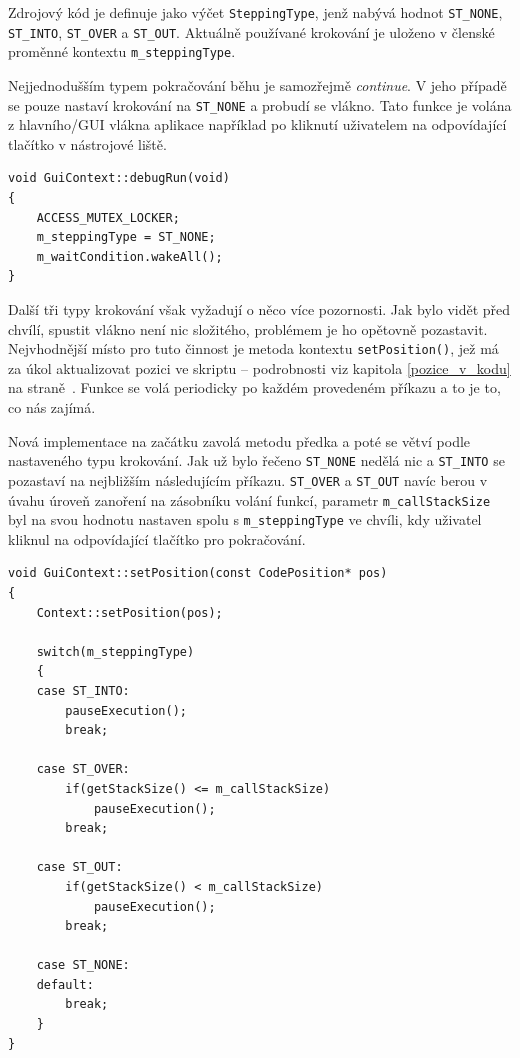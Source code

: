 \documentclass[11pt,twoside,a4paper]{book}
\begin{document}
Zdrojový kód je definuje jako výčet \texttt{SteppingType}, jenž nabývá hodnot \texttt{ST\_NONE}, \texttt{ST\_INTO}, \texttt{ST\_OVER} a \texttt{ST\_OUT}. Aktuálně používané krokování je uloženo v členské proměnné kontextu \texttt{m\_step\-ping\-Type}.

Nejjednodušším typem pokračování běhu je samozřejmě \textit{continue}. V jeho případě se pouze nastaví krokování na \texttt{ST\_NONE} a probudí se vlákno. Tato funkce je volána z hlavního/GUI vlákna aplikace například po kliknutí uživatelem na odpovídající tlačítko v nástrojové liště.

\begin{verbatim}
void GuiContext::debugRun(void)
{
    ACCESS_MUTEX_LOCKER;
    m_steppingType = ST_NONE;
    m_waitCondition.wakeAll();
}
\end{verbatim}

Další tři typy krokování však vyžadují o něco více pozornosti. Jak bylo vidět před chvílí, spustit vlákno není nic složitého, problémem je ho opětovně pozastavit. Nejvhodnější místo pro tuto činnost je metoda kontextu \texttt{setPosition()}, jež má za úkol aktualizovat pozici ve skriptu -- podrobnosti viz kapitola \ref{pozice_v_kodu} na straně~\pageref{pozice_v_kodu}. Funkce se volá periodicky po každém provedeném příkazu a to je to, co nás zajímá.

Nová implementace na začátku zavolá metodu předka a poté se větví podle nastaveného typu krokování. Jak už bylo řečeno \texttt{ST\_NONE} nedělá nic a \texttt{ST\_INTO} se pozastaví na nejbližším následujícím příkazu. \texttt{ST\_OVER} a \texttt{ST\_OUT} navíc berou v úvahu úroveň zanoření na zásobníku volání funkcí, parametr \texttt{m\_callStackSize} byl na svou hodnotu nastaven spolu s \texttt{m\_steppingType} ve chvíli, kdy uživatel kliknul na odpovídající tlačítko pro pokračování.

\begin{verbatim}
void GuiContext::setPosition(const CodePosition* pos)
{
    Context::setPosition(pos);

    switch(m_steppingType)
    {
    case ST_INTO:
        pauseExecution();
        break;

    case ST_OVER:
        if(getStackSize() <= m_callStackSize)
            pauseExecution();
        break;

    case ST_OUT:
        if(getStackSize() < m_callStackSize)
            pauseExecution();
        break;

    case ST_NONE:
    default:
        break;
    }
}
\end{verbatim}
\end{document}

